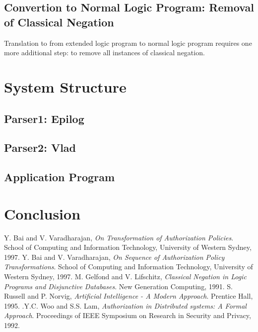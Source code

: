 \documentclass[a4paper]{article}
\begin{document}
    \subsection{Convertion to Normal Logic Program: Removal of Classical Negation}

      Translation to from extended logic program to normal logic program 
      requires one more additional step: to remove all instances of classical 
      negation. 

    \pagebreak

  \section{System Structure}

    \subsection{Parser1: Epilog}

    \subsection{Parser2: Vlad}

    \subsection{Application Program}

    \pagebreak

  \section{Conclusion}

    \pagebreak

  \begin{thebibliography}{}
    Y. Bai and V. Varadharajan, \emph{On Transformation of Authorization Policies}. School of Computing and Information Technology, University of Western Sydney, 1997.
    Y. Bai and V. Varadharajan, \emph{On Sequence of Authorization Policy Transformations}. School of Computing and Information Technology, University of Western Sydney, 1997.
    M. Gelfond and V. Lifschitz, \emph{Classical Negation in Logic Programs and Disjunctive Databases}. New Generation Computing, 1991.
    S. Russell and P. Norvig, \emph{Artificial Intelligence - A Modern Approach}. Prentice Hall, 1995.
    .Y.C. Woo and S.S. Lam, \emph{Authorization in Distributed systems: A Formal Approach}. Proceedings of IEEE Symposium on Research in Security and Privacy, 1992.
  \end{thebibliography}
\end{document}
